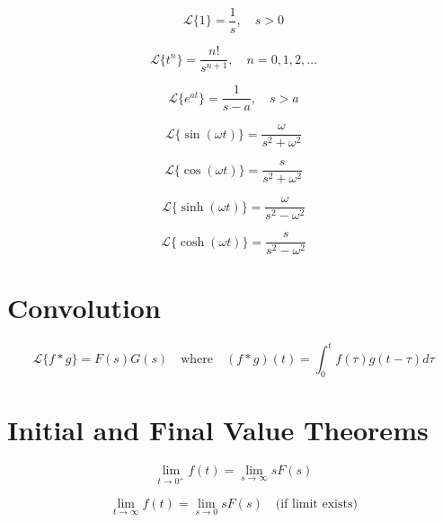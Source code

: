 \documentclass[fleqn]{article}
\begin{document}
\begin{multicols}{2}
\[
\mathcal{L}\{1\} = \frac{1}{s}, \quad s > 0
\]

\[
\mathcal{L}\{t^n\} = \frac{n!}{s^{n+1}}, \quad n = 0,1,2,\ldots
\]

\[
\mathcal{L}\{e^{at}\} = \frac{1}{s - a}, \quad s > a
\]

\[
\mathcal{L}\{\sin(\omega t)\} = \frac{\omega}{s^2 + \omega^2}
\]

\[
\mathcal{L}\{\cos(\omega t)\} = \frac{s}{s^2 + \omega^2}
\]

\[
\mathcal{L}\{\sinh(\omega t)\} = \frac{\omega}{s^2 - \omega^2}
\]

\[
\mathcal{L}\{\cosh(\omega t)\} = \frac{s}{s^2 - \omega^2}
\]

\section*{Convolution}

\[
\mathcal{L}\{f * g\} = F(s) G(s)
\quad\text{where}\quad
(f * g)(t) = \int_0^t f(\tau) g(t-\tau) d\tau
\]

\section*{Initial and Final Value Theorems}

\[
\lim_{t \to 0^+} f(t) = \lim_{s \to \infty} s F(s)
\]

\[
\lim_{t \to \infty} f(t) = \lim_{s \to 0} s F(s)
\quad \text{(if limit exists)}
\]

\end{multicols}
\end{document}
